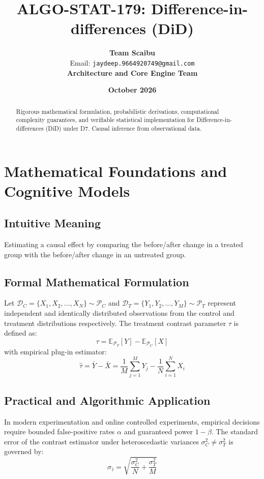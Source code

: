 \documentclass[11pt,a4paper]{article}
\title{\textbf{ALGO-STAT-179: Difference-in-differences (DiD)}}
\author{\textbf{Team Scaibu} \\ \small Email: \texttt{jaydeep.9664920749@gmail.com} \\ \small \textbf{Architecture and Core Engine Team}}
\date{\textbf{October 2026}}
\theoremstyle{definition}
\begin{document}
\maketitle

\begin{abstract}
Rigorous mathematical formulation, probabilistic derivations, computational complexity guarantees, and verifiable statistical implementation for Difference-in-differences (DiD) under D7. Causal inference from observational data.
\end{abstract}

\section{Mathematical Foundations and Cognitive Models}

\subsection{Intuitive Meaning}
Estimating a causal effect by comparing the before/after change in a treated group with the before/after change in an untreated group.

\subsection{Formal Mathematical Formulation}
Let $\mathcal{D}_C = \{X_1, X_2, \dots, X_N\} \sim \mathcal{P}_C$ and $\mathcal{D}_T = \{Y_1, Y_2, \dots, Y_M\} \sim \mathcal{P}_T$ represent independent and identically distributed observations from the control and treatment distributions respectively.
The treatment contrast parameter $\tau$ is defined as:
\begin{equation}
\tau = \mathbb{E}_{\mathcal{P}_T}[Y] - \mathbb{E}_{\mathcal{P}_C}[X]
\end{equation}
with empirical plug-in estimator:
\begin{equation}
\hat{\tau} = \bar{Y} - \bar{X} = \frac{1}{M} \sum_{j=1}^M Y_j - \frac{1}{N} \sum_{i=1}^N X_i
\end{equation}

\subsection{Practical and Algorithmic Application}
In modern experimentation and online controlled experiments, empirical decisions require bounded false-positive rates $\alpha$ and guaranteed power $1 - \beta$.
The standard error of the contrast estimator under heteroscedastic variances $\sigma_C^2 \neq \sigma_T^2$ is governed by:
\begin{equation}
\sigma_{\hat{\tau}} = \sqrt{\frac{\sigma_C^2}{N} + \frac{\sigma_T^2}{M}}
\end{equation}
\end{document}
